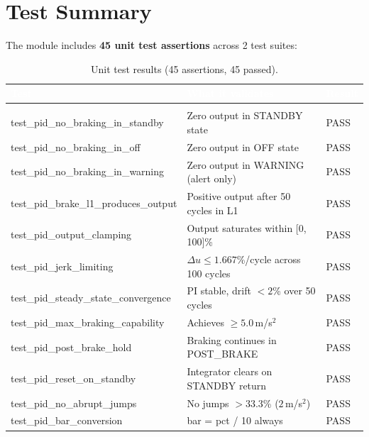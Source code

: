 \documentclass[12pt]{article}
\begin{document}
\section{Test Summary}

The module includes \textbf{45 unit test assertions} across 2 test suites:

\begin{table}[H]
\centering
\caption{Unit test results (45 assertions, 45 passed).}
\footnotesize
\begin{tabularx}{\textwidth}{|>{\raggedright\arraybackslash}p{3.8cm}
                              |>{\raggedright\arraybackslash}X
                              |>{\centering\arraybackslash}p{1.0cm}|}
\hline
\rowcolor{sectionblue}
\textcolor{white}{\textbf{Test}} &
\textcolor{white}{\textbf{What it validates}} &
\textcolor{white}{\textbf{Result}} \\ \hline

\multicolumn{3}{|c|}{\cellcolor{blue!5}\textit{test\_pid.c --- 18 assertions}} \\ \hline
test\_pid\_no\_braking\_in\_standby & Zero output in STANDBY state & PASS \\ \hline
test\_pid\_no\_braking\_in\_off & Zero output in OFF state & PASS \\ \hline
test\_pid\_no\_braking\_in\_warning & Zero output in WARNING (alert only) & PASS \\ \hline
test\_pid\_brake\_l1\_produces\_output & Positive output after 50 cycles in L1 & PASS \\ \hline
test\_pid\_output\_clamping & Output saturates within [0, 100]\% & PASS \\ \hline
test\_pid\_jerk\_limiting & $\Delta u \leq 1.667$\%/cycle across 100 cycles & PASS \\ \hline
test\_pid\_steady\_state\_convergence & PI stable, drift $< 2$\% over 50 cycles & PASS \\ \hline
test\_pid\_max\_braking\_capability & Achieves $\geq 5.0$\,m/s$^2$ & PASS \\ \hline
test\_pid\_post\_brake\_hold & Braking continues in POST\_BRAKE & PASS \\ \hline
test\_pid\_reset\_on\_standby & Integrator clears on STANDBY return & PASS \\ \hline
test\_pid\_no\_abrupt\_jumps & No jumps $> 33.3$\% ($2$\,m/s$^2$) & PASS \\ \hline
test\_pid\_bar\_conversion & bar = pct / 10 always & PASS \\ \hline


\end{tabularx}
\end{table}
\end{document}
